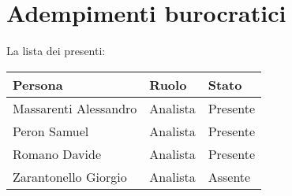\section{Adempimenti burocratici}

La lista dei presenti:

\begin{center}
    \begin{tabularx}{\linewidth}{X l l}            
        \textbf{Persona} & \textbf{Ruolo} & \textbf{Stato}\\

        \hline

        Massarenti Alessandro & Analista & Presente\\
        Peron Samuel & Analista & Presente\\
        Romano Davide & Analista & Presente\\
        Zarantonello Giorgio & Analista & Assente\\

    \end{tabularx}
\end{center}
